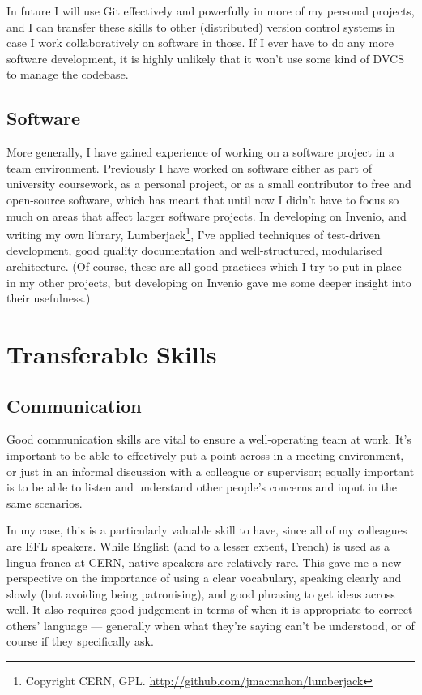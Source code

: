 \documentclass[a4paper,11pt]{article} %
\begin{document}
In future I will use Git effectively and powerfully in more of my personal projects, and I can transfer these skills to other (distributed) version control systems in case I work collaboratively on software in those.  If I ever have to do any more software development, it is highly unlikely that it won't use some kind of DVCS to manage the codebase.

\subsection{Software}
\label{sec:technical.software}
More generally, I have gained experience of working on a software project in a team environment.  Previously I have worked on software either as part of university coursework, as a personal project, or as a small contributor to free and open-source software, which has meant that until now I didn't have to focus so much on areas that affect larger software projects.  In developing on Invenio, and writing my own library, Lumberjack\footnote{Copyright CERN, GPL.  \url{http://github.com/jmacmahon/lumberjack}}, I've applied techniques of test-driven development, good quality documentation and well-structured, modularised architecture.  (Of course, these are all good practices which I try to put in place in my other projects, but developing on Invenio  gave me some deeper insight into their usefulness.)


\section{Transferable Skills}
\label{sec:transferable}

\subsection{Communication}
\label{sec:transferable.communication}
Good communication skills are vital to ensure a well-operating team at work.  It's important to be able to effectively put a point across in a meeting environment, or just in an informal discussion with a colleague or supervisor; equally important is to be able to listen and understand other people's concerns and input in the same scenarios.

In my case, this is a particularly valuable skill to have, since all of my colleagues are EFL speakers.  While English (and to a lesser extent, French) is used as a lingua franca at CERN, native speakers are relatively rare.  This gave me a new perspective on the importance of using a clear vocabulary, speaking clearly and slowly (but avoiding being patronising), and good phrasing to get ideas across well.  It also requires good judgement in terms of when it is appropriate to correct others' language --- generally when what they're saying can't be understood, or of course if they specifically ask.
\end{document}
